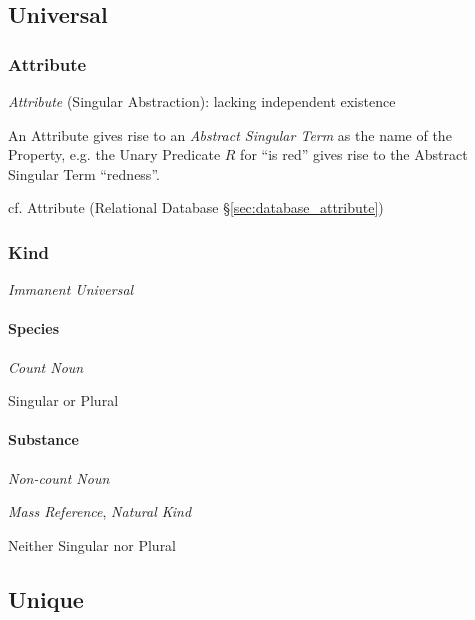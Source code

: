 \subsection{Universal}\label{sec:universal}

\subsubsection{Attribute}\label{sec:attribute}

\emph{Attribute} (Singular Abstraction): lacking independent existence

An Attribute gives rise to an \emph{Abstract Singular Term} as the name
of the Property, e.g. the Unary Predicate $R$ for ``is red'' gives
rise to the Abstract Singular Term ``redness''. \cite{laycock10}

\fist cf. Attribute (Relational Database \S\ref{sec:database_attribute})



\subsubsection{Kind}\label{sec:universal_kind}

\emph{Immanent Universal}



\paragraph{Species}\label{sec:species}\hfill

\emph{Count Noun}

Singular or Plural



\paragraph{Substance}\label{sec:substance}\hfill

\emph{Non-count Noun}

\emph{Mass Reference}, \emph{Natural Kind}

Neither Singular nor Plural



\subsection{Unique}\label{sec:unique}

